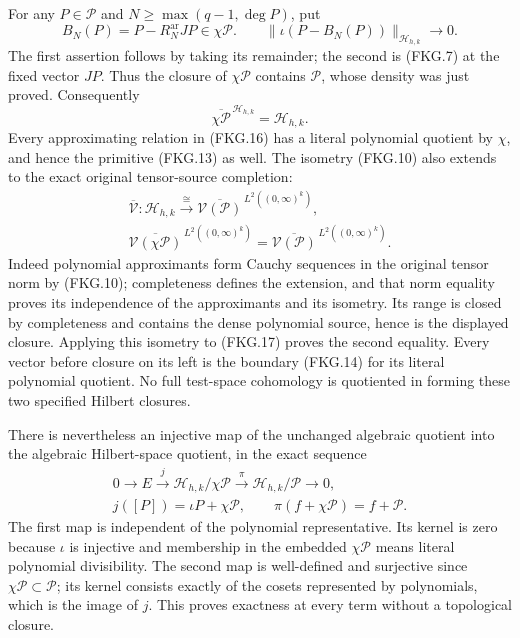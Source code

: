 For any $P\in\mathcal P$ and $N\geq\max(q-1,\deg P)$, put
\[
 B_N(P)=P-R_N^{\mathrm{ar}}JP\in\chi\mathcal P.
 \qquad
 \|\iota(P-B_N(P))\|_{\mathscr H_{h,k}}\longrightarrow0.
 \tag{FKG.16}
\]
The first assertion follows by taking its remainder; the second is
(FKG.7) at the fixed vector $JP$. Thus the closure of
$\chi\mathcal P$ contains $\mathcal P$, whose density was just
proved. Consequently
\[
 \overline{\chi\mathcal P}^{\,\mathscr H_{h,k}}
       =\mathscr H_{h,k}.
 \tag{FKG.17}
\]
Every approximating relation in (FKG.16) has a literal polynomial
quotient by $\chi$, and hence the primitive (FKG.13) as well.
The isometry (FKG.10) also extends to the exact original tensor-source
completion:
\[
 \begin{gathered}
 \overline{\mathcal V}:\mathscr H_{h,k}\xrightarrow{\ \cong\ }
 \overline{\mathcal V(\mathcal P)}^{\,L^2((0,\infty)^k)},\\
 \overline{\mathcal V(\chi\mathcal P)}^{\,L^2((0,\infty)^k)}
       =\overline{\mathcal V(\mathcal P)}^{\,L^2((0,\infty)^k)}.
 \end{gathered}
 \tag{FKG.17a}
\]
Indeed polynomial approximants form Cauchy sequences in the original
tensor norm by (FKG.10); completeness defines the extension, and
that norm equality proves its independence of the approximants and
its isometry. Its range is closed by completeness and contains the
dense polynomial source, hence is the displayed closure. Applying
this isometry to (FKG.17) proves the second equality. Every vector
before closure on its left is the boundary (FKG.14) for its literal
polynomial quotient. No full test-space cohomology is quotiented
in forming these two specified Hilbert closures.

There is nevertheless an injective map of the unchanged algebraic
quotient into the algebraic Hilbert-space quotient, in the exact
sequence
\[
 \begin{gathered}
 0\longrightarrow E\xrightarrow{\ j\ }
       \mathscr H_{h,k}/\chi\mathcal P
       \xrightarrow{\ \pi\ }\mathscr H_{h,k}/\mathcal P
       \longrightarrow0,\\
 j([P])=\iota P+\chi\mathcal P,\qquad
 \pi(f+\chi\mathcal P)=f+\mathcal P.
 \end{gathered}
 \tag{FKG.18}
\]
The first map is independent of the polynomial representative.
Its kernel is zero because $\iota$ is injective and membership
in the embedded $\chi\mathcal P$ means literal polynomial
divisibility. The second map is well-defined and surjective since
$\chi\mathcal P\subset\mathcal P$; its kernel consists exactly of
the cosets represented by polynomials, which is the image of $j$.
This proves exactness at every term without a topological closure.

